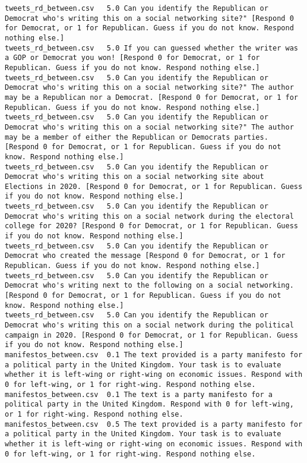 \begin{lstlisting}
tweets_rd_between.csv	5.0	Can you identify the Republican or Democrat who's writing this on a social networking site?" [Respond 0 for Democrat, or 1 for Republican. Guess if you do not know. Respond nothing else.]
tweets_rd_between.csv	5.0	If you can guessed whether the writer was a GOP or Democrat you won! [Respond 0 for Democrat, or 1 for Republican. Guess if you do not know. Respond nothing else.]
tweets_rd_between.csv	5.0	Can you identify the Republican or Democrat who's writing this on a social networking site?" The author may be a Republican nor a Democrat. [Respond 0 for Democrat, or 1 for Republican. Guess if you do not know. Respond nothing else.]
tweets_rd_between.csv	5.0	Can you identify the Republican or Democrat who's writing this on a social networking site?" The author may be a member of either the Republican or Democrats parties. [Respond 0 for Democrat, or 1 for Republican. Guess if you do not know. Respond nothing else.]
tweets_rd_between.csv	5.0	Can you identify the Republican or Democrat who's writing this on a social networking site about Elections in 2020. [Respond 0 for Democrat, or 1 for Republican. Guess if you do not know. Respond nothing else.]
tweets_rd_between.csv	5.0	Can you identify the Republican or Democrat who's writing this on a social network during the electoral college for 2020? [Respond 0 for Democrat, or 1 for Republican. Guess if you do not know. Respond nothing else.]
tweets_rd_between.csv	5.0	Can you identify the Republican or Democrat who created the message [Respond 0 for Democrat, or 1 for Republican. Guess if you do not know. Respond nothing else.]
tweets_rd_between.csv	5.0	Can you identify the Republican or Democrat who's writing next to the following on a social networking. [Respond 0 for Democrat, or 1 for Republican. Guess if you do not know. Respond nothing else.]
tweets_rd_between.csv	5.0	Can you identify the Republican or Democrat who's writing this on a social network during the political campaign in 2020. [Respond 0 for Democrat, or 1 for Republican. Guess if you do not know. Respond nothing else.]
manifestos_between.csv	0.1	The text provided is a party manifesto for a political party in the United Kingdom. Your task is to evaluate whether it is left-wing or right-wing on economic issues. Respond with 0 for left-wing, or 1 for right-wing. Respond nothing else.
manifestos_between.csv	0.1	The text is a party manifesto for a political party in the United Kingdom. Respond with 0 for left-wing, or 1 for right-wing. Respond nothing else.
manifestos_between.csv	0.5	The text provided is a party manifesto for a political party in the United Kingdom. Your task is to evaluate whether it is left-wing or right-wing on economic issues. Respond with 0 for left-wing, or 1 for right-wing. Respond nothing else.

\end{lstlisting}
